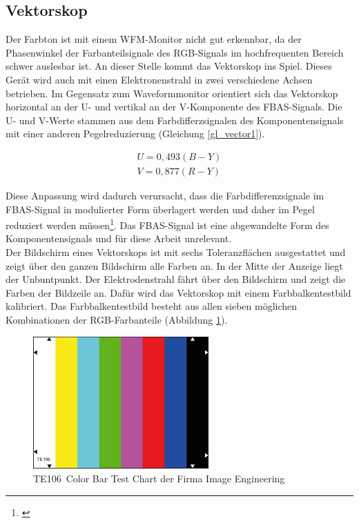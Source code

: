 \subsection{Vektorskop}
\label{sec_vector}
Der Farbton ist mit einem WFM-Monitor nicht gut erkennbar, da der Phasenwinkel der Farbanteilsignale des RGB-Signals im hochfrequenten Bereich schwer auslesbar ist. An dieser Stelle kommt das Vektorskop ins Spiel. Dieses Gerät wird auch mit einen Elektronenstrahl in zwei verschiedene Achsen betrieben. Im Gegensatz zum Waveformmonitor orientiert sich das Vektorskop horizontal an der U- und vertikal an der V-Komponente des FBAS-Signals. Die U- und V-Werte stammen aus dem Farbdifferzsignalen des Komponentensignals mit einer anderen Pegelreduzierung (Gleichung \ref{gl_vector1}).

\begin{eqnarray}\label{gl_vector1}
	U = 0,493(B-Y)\\
	V = 0,877(R-Y)
\end{eqnarray}

\noindent Diese Anpassung wird dadurch verursacht, dass die Farbdifferenzsignale im FBAS-Signal in modulierter Form überlagert werden und daher im Pegel reduziert werden müssen\footnote{\cite[84]{schmidt}}. Das FBAS-Signal ist eine abgewandelte Form des Komponentensignals und für diese Arbeit unrelevant.\\
Der Bildschirm eines Vektorskops ist mit sechs Toleranzflächen ausgestattet und zeigt über den ganzen Bildschirm alle Farben an. In der Mitte der Anzeige liegt der Unbuntpunkt. Der Elektrodenstrahl fährt über den Bildschirm und zeigt die Farben der Bildzeile an. Dafür wird das Vektorskop mit einem Farbbalkentestbild kalibriert. Das Farbbalkentestbild besteht aus allen sieben möglichen Kombinationen der RGB-Farbanteile (Abbildung \ref{b_te106}).

\begin{figure}[H]     %
\centering
\includegraphics[width=0.6\textwidth]{bilder/te106} 
\caption {\glqq TE106\grqq\ Color Bar Test Chart der Firma Image Engineering\protect\footnotemark}\label{b_te106}
\end{figure}

